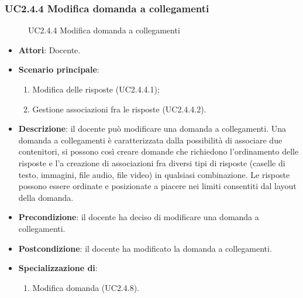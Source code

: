 \subsubsection{UC2.4.4 Modifica domanda a collegamenti}
\begin{figure}[H]
\centering
\noindent{}
\caption{UC2.4.4 Modifica domanda a collegamenti}
\end{figure}
\begin{itemize}
\item \textbf{Attori}: Docente.
\item \textbf{Scenario principale}:
\begin{enumerate}
\item Modifica delle risposte (UC2.4.4.1);
\item Gestione associazioni fra le risposte  (UC2.4.4.2).
\end{enumerate}
\item \textbf{Descrizione}: il docente può modificare una domanda a collegamenti. Una domanda a collegamenti è caratterizzata dalla possibilità di associare due contenitori, si possono così creare domande che richiedono l'ordinamento delle risposte e l'a creazione di associazioni fra diversi tipi di risposte (caselle di testo, immagini, file audio, file video) in qualsiasi combinazione. Le risposte possono essere ordinate e posizionate a piacere nei limiti consentiti dal layout della domanda.
\item \textbf{Precondizione}: il docente ha deciso di modificare una domanda a collegamenti.
\item \textbf{Postcondizione}: il docente ha modificato la domanda a collegamenti.
\item \textbf{Specializzazione di}:
\begin{enumerate}
\item Modifica domanda (UC2.4.8).
\end{enumerate}
\end{itemize}
